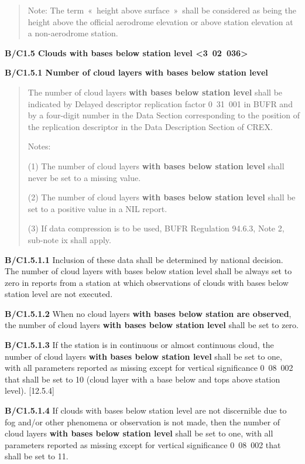 \begin{quote}
Note: The term~«~height above surface~»~shall be considered as being the height above the official aerodrome elevation or above station elevation at a non-aerodrome station.
\end{quote}

\textbf{B/C1.5 Clouds with bases below station level \textless3~02~036\textgreater{}}

\textbf{B/C1.5.1 Number of cloud layers with bases below station level}

\begin{quote}
The number of cloud layers \textbf{with bases below station level} shall be indicated by Delayed descriptor replication factor 0~31~001 in BUFR and by a four-digit number in the Data Section corresponding to the position of the replication descriptor in the Data Description Section of CREX.

Notes:

(1) The number of cloud layers \textbf{with bases below station level} shall never be set to a missing value.

(2) The number of cloud layers \textbf{with bases below station level} shall be set to a positive value in a NIL report.

(3) If data compression is to be used, BUFR Regulation 94.6.3, Note 2, sub-note ix shall apply.
\end{quote}

\textbf{B/C1.5.1.1} Inclusion of these data shall be determined by national decision. The number of cloud layers with bases below station level shall be always set to zero in reports from a station at which observations of clouds with bases below station level are not executed.

\textbf{B/C1.5.1.2} When no cloud layers \textbf{with bases below station are observed}, the number of cloud layers \textbf{with bases below station level} shall be set to zero.

\textbf{B/C1.5.1.3} If the station is in continuous or almost continuous cloud, the number of cloud layers \textbf{with bases below station level} shall be set to one, with all parameters reported as missing except for vertical significance 0~08~002 that shall be set to 10 (cloud layer with a base below and tops above station level). {[}12.5.4{]}

\textbf{B/C1.5.1.4} If clouds with bases below station level are not discernible due to fog and/or other phenomena or observation is not made, then the number of cloud layers \textbf{with bases below station level} shall be set to one, with all parameters reported as missing except for vertical significance 0~08~002 that shall be set to 11.

